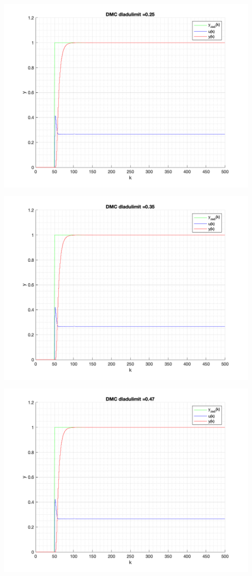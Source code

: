 \documentclass[a4paper, 11pt]{article}
\begin{document}
\begin{enumerate}
 \includegraphics[width=\linewidth]{./ModelsP6_dulimit/P4_DMC_dulimit_0_25_png.png} 
 
 \includegraphics[width=\linewidth]{./ModelsP6_dulimit/P4_DMC_dulimit_0_35_png.png} 
 
 \includegraphics[width=\linewidth]{./ModelsP6_dulimit/P4_DMC_dulimit_0_47_png.png} 
 

\end{enumerate}
\end{document}
